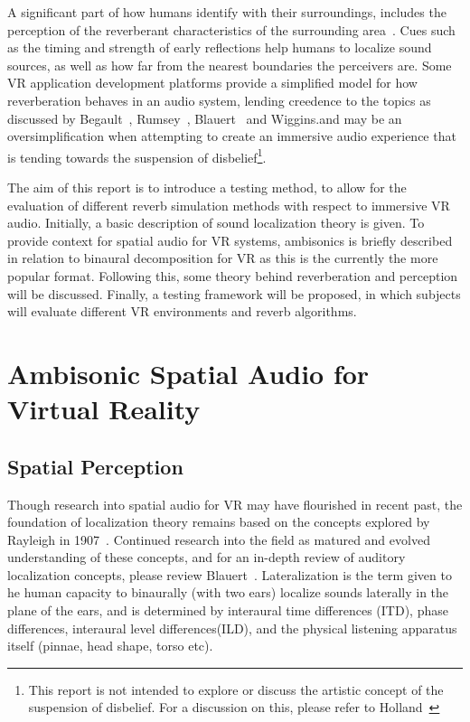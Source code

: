 \documentclass[paper=a4, fontsize=10pt, font=arial]{scrartcl} %
\numberwithin{equation}{section} %
\numberwithin{figure}{section} %
\numberwithin{table}{section} %
\begin{document}
A significant part of how humans identify with their surroundings, includes the perception of the reverberant characteristics of the surrounding area~\cite{rumsey2012spatial}. 
Cues such as the timing and strength of early reflections help humans to localize sound sources, as well as how far from the nearest boundaries the perceivers are. 
Some VR application development platforms provide a simplified model for how reverberation behaves in an audio system, lending creedence to the topics as discussed by Begault~\cite{Begault1995}, Rumsey~\cite{rumsey2012spatial}, Blauert~\cite{Blauert1997} and Wiggins\cite{Wiggins2004}.and may be an oversimplification when attempting to create an immersive audio experience that is tending towards the suspension of disbelief\footnote{This report is not intended to explore or discuss the artistic concept of the suspension of disbelief. For a discussion on this, please refer to Holland~\cite{Holland2003}}.\par

The aim of this report is to introduce a testing method, to allow for the evaluation of different reverb simulation methods with respect to immersive VR audio. 
Initially, a basic description of sound localization theory is given. 
To provide context for spatial audio for VR systems, ambisonics is briefly described in relation to binaural decomposition for VR as this is the currently the more popular format. 
Following this, some theory behind reverberation and perception will be discussed.
Finally, a testing framework will be proposed, in which subjects will evaluate different VR environments and reverb algorithms.

\newpage

\section{Ambisonic Spatial Audio for Virtual Reality}
\subsection{Spatial Perception}

Though  research into spatial audio for VR may have flourished in recent past, the foundation of localization theory remains based on the concepts explored by Rayleigh in 1907~\cite{Blauert1997}. Continued research into the field as matured and evolved understanding of these concepts, and for an in-depth review of auditory localization concepts, please review Blauert~\cite{Blauert1997}. Lateralization is the term given to he human capacity to binaurally (with two ears) localize sounds laterally in the plane of the ears, and is determined by interaural time differences (ITD), phase differences, interaural level differences(ILD), and the physical listening apparatus itself (pinnae, head shape, torso etc).
\end{document}
